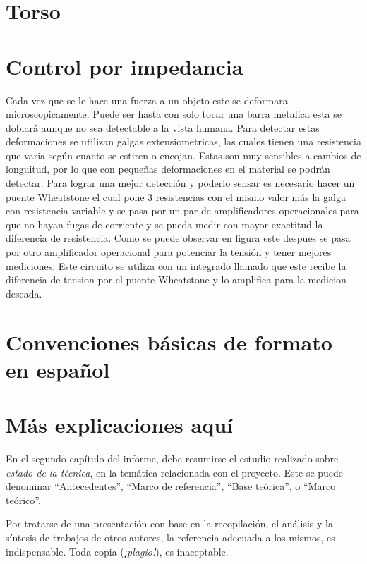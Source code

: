 \section{Torso}


\section{Control por impedancia}
Cada vez que se le hace una fuerza a un objeto este se deformara microscopicamente. Puede ser hasta con solo tocar una barra metalica esta se doblará
aunque no sea detectable a la vista humana. Para detectar estas deformaciones se utilizan galgas extensiometricas, las cuales tienen una resistencia 
que varia según cuanto se estiren o encojan. Estas son muy sensibles a cambios de longuitud, por lo que con pequeñas deformaciones en el material se
podrán detectar. Para lograr una mejor detección y poderlo sensar es necesario hacer un puente Wheatstone el cual pone 3 resistencias con el mismo valor
más la galga con resistencia variable y se pasa por un par de amplificadores operacionales para que no hayan fugas de corriente y se pueda medir
con mayor exactitud la diferencia de resistencia. Como se puede observar en figura \figura este despues se pasa por otro amplificador operacional 
para potenciar la tensión y tener mejores mediciones. Este circuito se utiliza con un integrado llamado \circuito que este recibe la diferencia de tension
por el puente Wheatstone y lo amplifica para la medicion deseada.


\section{Convenciones básicas de formato en español}



\section{Más explicaciones aquí}

En el segundo capítulo del informe, debe resumirse el estudio realizado sobre \emph{estado de la técnica}, en la temática relacionada con el proyecto.  Este se puede denominar ``Antecedentes'', ``Marco de referencia'', ``Base teórica'', o ``Marco teórico''.

Por tratarse de una presentación con base en la recopilación, el análisis y la síntesis de trabajos de otros autores, la referencia adecuada a los mismos, es indispensable.  Toda copia (\emph{¡plagio!}), es inaceptable.

